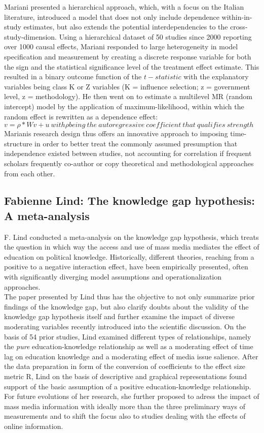 \documentclass[a4paper,man,natbib]{apa6}
\begin{document}
Mariani presented a hierarchical approach, which, with a focus on the Italian literature, introduced a model that does not only include dependence within-in-study estimates, but also extends the potential interdependencies to the cross-study-dimension. Using a hierarchical dataset of 50 studies since 2000 reporting over 1000 causal effects, Mariani responded to large heterogeneity in model specification and measurement by creating a discrete response variable for both the sign and the statistical significance level of the treatment effect estimate. This resulted in a binary outcome function of the $t-statistic$ with the explanatory variables being class K or Z variables (K = influence selection; z = government level, z = methodology). He then went on to estimate a multilevel MR (random intercept) model by the application of maximum-likelihood, within which the random effect is rewritten as a dependence effect: $v = \rho * Wv + u\ with \rho being\ the\ autoregressive\ coefficient\ that\ qualifies\ strength$\\
Marianis research design thus offers an innovative approach to imposing time-structure in order to better treat the commonly assumed presumption that independence existed between studies, not accounting for correlation if frequent scholars frequently co-author or copy theoretical and methodological approaches from each other.


\subsection{Fabienne Lind: The knowledge gap hypothesis: A meta-analysis}

F. Lind conducted a meta-analysis on the knowledge gap hypothesis, which treats the question in which way the access and use of mass media mediates the effect of education on political knowledge. Historically, different theories, reaching from a positive to a negative interaction effect, have been empirically presented, often with significantly diverging model assumptions and operationalization approaches.\\
The paper presented by Lind thus has the objective to not only summarize prior findings of the knowledge gap, but also clarify doubts about the validity of the knowledge gap hypothesis itself and further examine the impact of diverse moderating variables recently introduced into the scientific discussion. On the basis of 54 prior studies, Lind examined different types of relationships, namely the \textit{pure} education-knowledge relationship as well as a moderating effect of time lag on education knowledge and a moderating effect of media issue salience. 
After the data preparation in form of the conversion of coefficients to the effect size metric R, Lind on the basis of descriptive and graphical representations found support of the basic assumption of a positive education-knowledge relationship. For future evolutions of her research, she further proposed to adress the impact of mass media information with ideally more than the three preliminary ways of measurements and to shift the focus also to studies dealing with the effects of online information. 
\end{document}
